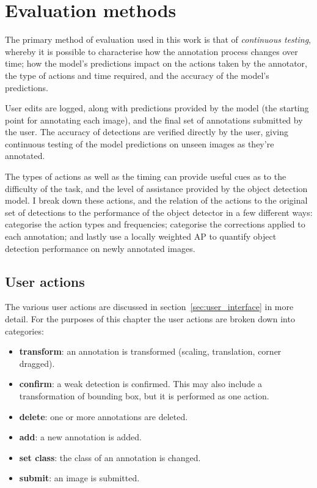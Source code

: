 \section {Evaluation methods}
\label{sec:ann_evaluation}

The primary method of evaluation used in this work is that of \emph{continuous testing}, whereby it is possible to characterise how the annotation process changes over time; how the model's predictions impact on the actions taken by the annotator, the type of actions and time required, and the accuracy of the model's predictions.

User edits are logged, along with predictions provided by the model (the starting point for annotating each image), and the final set of annotations submitted by the user. The accuracy of detections are verified directly by the user, giving continuous testing of the model predictions on unseen images as they're annotated.

The types of actions as well as the timing can provide useful cues as to the difficulty of the task, and the level of assistance provided by the object detection model. I break down these actions, and the relation of the actions to the original set of detections to the performance of the object detector in a few different ways: categorise the action types and frequencies; categorise the corrections applied to each annotation; and lastly use a locally weighted \gls{AP} to quantify object detection performance on newly annotated images.

\subsection{User actions}

The various user actions are discussed in section~\ref{sec:user_interface} in more detail. For the purposes of this chapter the user actions are broken down into categories:

\begin{itemize}
    \item {\bf transform}: an annotation is transformed (scaling, translation, corner dragged).
    \item {\bf confirm}: a weak detection is confirmed. This may also include a transformation of bounding box, but it is performed as one action.
    \item {\bf delete}: one or more annotations are deleted.
    \item {\bf add}: a new annotation is added.
    \item {\bf set class}: the class of an annotation is changed.    
    \item {\bf submit}: an image is submitted.    
\end{itemize}

